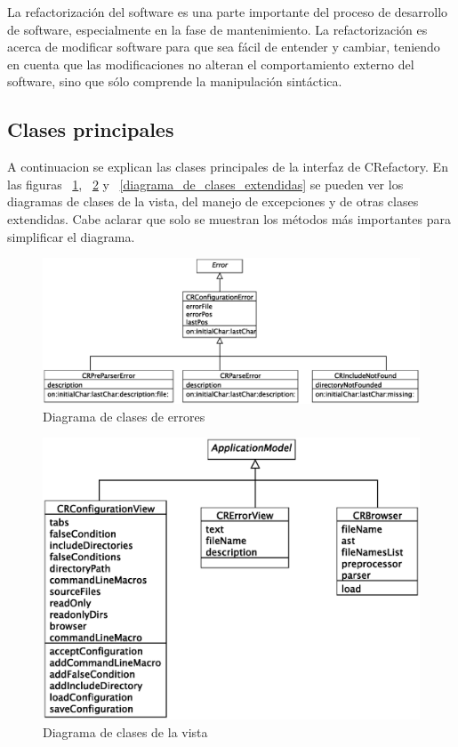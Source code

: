 \documentclass[a4paper,oneside,12pt]{article}
\begin{document}
La refactorización del software es una parte importante del proceso de desarrollo de software, especialmente en la fase de mantenimiento. La refactorización es acerca de modificar software para que sea fácil de entender y cambiar, teniendo en cuenta que las modificaciones no alteran el comportamiento externo del software, sino que sólo comprende la manipulación sintáctica.


\subsection{Clases principales}

A continuacion se explican las clases principales de la interfaz de CRefactory. En las figuras ~\ref{diagrama_de_clases_excepciones}, ~\ref{diagrama_de_clases_vista} y ~\ref{diagrama_de_clases_extendidas} se pueden ver los diagramas de clases de la vista, del manejo de excepciones y de otras clases extendidas. Cabe aclarar que solo se muestran los m\'etodos m\'as importantes para simplificar el diagrama.

\begin{figure}[h!]
  \centering
    \includegraphics[scale=0.50]{images/diagrama_clases_excepciones.eps}
    \caption{Diagrama de clases de errores}
    \label{diagrama_de_clases_excepciones}
\end{figure}

\begin{figure}[h!]
  \centering
    \includegraphics[scale=0.60]{images/diagrama_clases_vista.eps}
    \caption{Diagrama de clases de la vista}
    \label{diagrama_de_clases_vista}
\end{figure}
\end{document}
